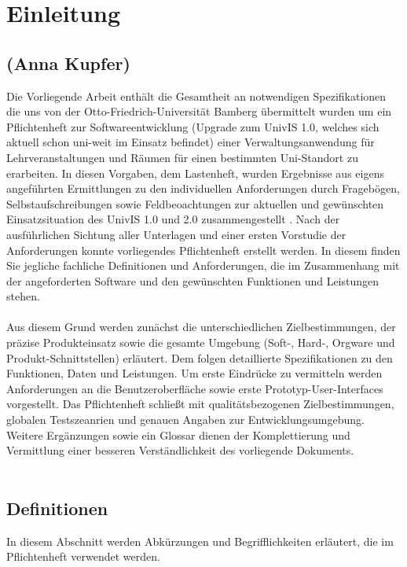 \section{Einleitung}
\label{sec:Einleitung}

\subsection*{(Anna Kupfer)}

Die Vorliegende Arbeit enthält die Gesamtheit an notwendigen Spezifikationen die uns von der Otto-Friedrich-Universität Bamberg übermittelt wurden um ein Pflichtenheft zur Softwareentwicklung (Upgrade zum UnivIS 1.0, welches sich aktuell schon uni-weit im Einsatz befindet) einer Verwaltungsanwendung für Lehrveranstaltungen und Räumen für einen bestimmten Uni-Standort zu erarbeiten.
In diesen Vorgaben, dem Lastenheft, wurden Ergebnisse aus eigens angeführten Ermittlungen zu den individuellen Anforderungen durch Fragebögen, Selbstaufschreibungen sowie Feldbeoachtungen zur aktuellen und gewünschten Einsatzsituation des UnivIS 1.0 und 2.0 zusammengestellt \cite{Balzert09}.
Nach der ausführlichen Sichtung aller Unterlagen und einer ersten Vorstudie der Anforderungen konnte vorliegendes Pflichtenheft erstellt werden. In diesem finden Sie jegliche fachliche Definitionen und Anforderungen, die im Zusammenhang mit der angeforderten Software und den gewünschten Funktionen und Leistungen stehen.
\\
\\
Aus diesem Grund werden zunächst die unterschiedlichen Zielbestimmungen, der präzise Produkteinsatz sowie die gesamte Umgebung (Soft-, Hard-, Orgware und Produkt-Schnittstellen) erläutert.
Dem folgen detaillierte Spezifikationen zu den Funktionen, Daten und Leistungen. Um erste Eindrücke zu vermitteln werden Anforderungen an die Benutzeroberfläche sowie erste Prototyp-User-Interfaces vorgestellt. Das Pflichtenheft schließt mit qualitätsbezogenen Zielbestimmungen, globalen Testszeanrien und genauen Angaben zur Entwicklungsumgebung.
Weitere Ergänzungen sowie ein Glossar dienen der Komplettierung und Vermittlung einer besseren Verständlichkeit des vorliegende Dokuments.
\\
\\
\subsection{Definitionen}
\label{sec:Definitionen}

In diesem Abschnitt werden Abkürzungen und Begrifflichkeiten erläutert, die im Pflichtenheft verwendet werden. \\[0.25cm]


